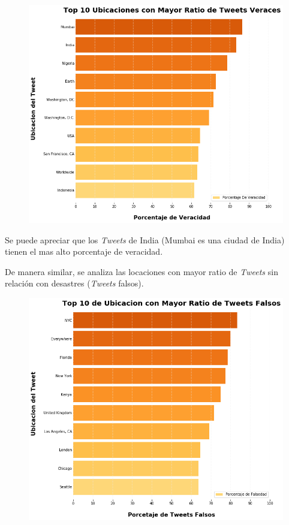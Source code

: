 \documentclass[titlepage,a4paper]{article}
\begin{document}
    \begin{figure}[H]
    \centering
    \includegraphics[width=1\textwidth]{graficos/Analisis de Locacion/top_10_locaciones_con_mayor_ratio_de_tweets_veraces.png}
    \caption{} 
    \end{figure}
    
    Se puede apreciar que los \textit{Tweets} de India (Mumbai es una ciudad de India) tienen el mas alto porcentaje de veracidad. 
    
    De manera similar, se analiza las locaciones con mayor ratio de \textit{Tweets} sin relación con desastres (\textit{Tweets} falsos). 
    
    \begin{figure}[H]
    \centering
    \includegraphics[width=1\textwidth]{graficos/Analisis de Locacion/top_10_locaciones_con_mayor_ratio_de_tweets_falsos.png}
    \caption{}
    \end{figure}
    
\end{document}
